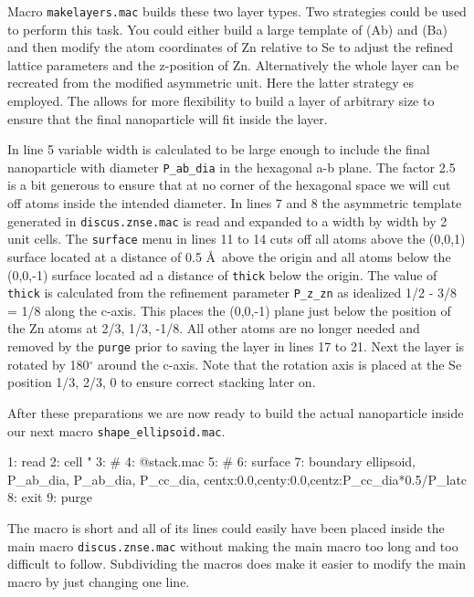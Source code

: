 Macro {\tt makelayers.mac} builds these two layer types. Two strategies 
could be used to perform this task. You could either build a large template
of (Ab) and (Ba) and then modify the atom coordinates of Zn relative to Se
to adjust the refined lattice parameters and the z-position of Zn. 
Alternatively the whole layer can be recreated from the modified asymmetric 
unit. Here the latter strategy es employed. The allows for more flexibility
to build a layer of arbitrary size to ensure that the final nanoparticle 
will fit inside the layer.

In line 5 variable width is calculated to be large enough to include the
final nanoparticle with diameter {\tt P\_ab\_dia} in the hexagonal a-b plane.
The factor 2.5 is a bit generous to ensure that at no corner of the hexagonal 
space we will cut off atoms inside the intended diameter. In lines 7 and 8
the asymmetric template generated in {\tt discus.znse.mac} is read and 
expanded to a width by width by 2 unit cells.  The {\tt surface} menu in
lines 11 to 14 cuts off all atoms above the (0,0,1) surface located at
a distance of 0.5 \AA\ above the origin and all atoms below the (0,0,-1)
surface located ad a distance of {\tt thick} below the origin. The value 
of {\tt thick} is calculated from the refinement parameter {\tt P\_z\_zn}
as idealized 1/2 - 3/8 = 1/8 along the c-axis. This places the (0,0,-1) plane
just below the position of the Zn atoms at 2/3,  1/3, -1/8. All other atoms
are no longer needed and removed by the  {\tt purge} prior to saving the 
layer in lines 17 to 21. Next the layer is rotated by 180$^\circ$ around the
c-axis. Note that the rotation axis is placed at the Se position 1/3, 2/3, 0 to
ensure correct stacking later on.

After these preparations we are now ready to build the actual nanoparticle
inside our next macro {\tt shape\_ellipsoid.mac}.
\begin{MacVerbatim}
 1: read
 2:    cell "%
 3: #
 4: @stack.mac
 5: #
 6: surface
 7:    boundary ellipsoid, P_ab_dia, P_ab_dia, P_cc_dia, centx:0.0,centy:0.0,centz:P_cc_dia*0.5/P_latc
 8: exit
 9: purge
\end{MacVerbatim}

The macro is short and all of its lines could easily have been placed inside
the main macro {\tt discus.znse.mac} without making the main macro too long
and too difficult to follow. Subdividing the macros does make it easier to
modify the main macro by just changing one line. 

